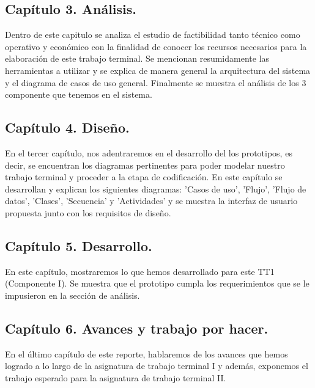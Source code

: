 \documentclass[12pt, a4paper, titlepage]{report}
\begin{document}
            \subsection{Capítulo 3. Análisis.}
                Dentro de este capitulo se analiza el estudio de factibilidad tanto t\'ecnico como operativo y económico con la finalidad de conocer los recursos necesarios para la elaboración de este trabajo terminal. Se mencionan resumidamente las herramientas a utilizar y se explica de manera general la arquitectura del sistema  y el diagrama de casos de uso general. Finalmente se muestra el análisis de los 3 componente que tenemos en el sistema.
             
            \subsection{Capítulo 4. Diseño.}
                En el tercer capítulo, nos adentraremos en el desarrollo del los prototipos, es decir, se encuentran los diagramas pertinentes para poder modelar nuestro trabajo terminal y proceder a la etapa de codificación. En este capítulo se desarrollan y explican los siguientes diagramas: 'Casos de uso', 'Flujo', 'Flujo de datos', 'Clases', 'Secuencia' y 'Actividades' y se muestra la interfaz de usuario propuesta junto con los requisitos de diseño.
                
            \subsection{Capítulo 5. Desarrollo.}
                En este capítulo, mostraremos lo que hemos desarrollado para este TT1 (Componente I). Se muestra que el prototipo cumpla los requerimientos que se le impusieron en la sección de análisis.
            
            \subsection{Capítulo 6. Avances y trabajo por hacer.}
                En el último capítulo de este reporte, hablaremos de los avances que hemos logrado a lo largo de la asignatura de trabajo terminal I y además, exponemos el trabajo esperado para la asignatura de trabajo terminal II.
                
    
\end{document}
